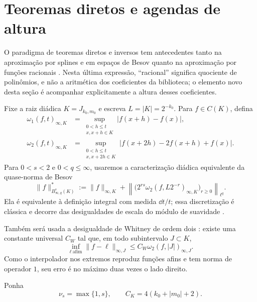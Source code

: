 \section{Teoremas diretos e agendas de altura}
\label{sec:direct-height}

O paradigma de teoremas diretos e inversos tem antecedentes tanto na
aproximação por splines e em espaços de Besov quanto na aproximação por funções
racionais \citep{petrushev1988,petrushevpopov1987}. Nesta última expressão,
``racional'' significa quociente de polinômios, e não a aritmética dos
coeficientes da biblioteca; o elemento novo desta seção é acompanhar
explicitamente a altura desses coeficientes.

Fixe a raiz diádica $K=J_{k_0,m_0}$ e escreva $L=|K|=2^{-k_0}$. Para
$f\in C(K)$, defina
\begin{align}
 \omega_1(f,t)_{\infty,K}
 &=\sup_{\substack{0<h\le t\\x,x+h\in K}}
   |f(x+h)-f(x)|,\label{eq:first-modulus}\\
 \omega_2(f,t)_{\infty,K}
 &=\sup_{\substack{0<h\le t\\x,x+2h\in K}}
   |f(x+2h)-2f(x+h)+f(x)|.
 \label{eq:second-modulus-direct}
\end{align}
Para $0<s<2$ e $0<q\le\infty$, usaremos a caracterização diádica equivalente da
quase-norma de Besov
\begin{equation}
 \|f\|_{B^s_{\infty,q}(K)}^*
 :=\|f\|_{\infty,K}
 +\left\|\bigl(2^{rs}\omega_2(f,L2^{-r})_{\infty,K}
           \bigr)_{r\ge0}\right\|_{\ell^q}.
 \label{eq:dyadic-besov-norm}
\end{equation}
Ela é equivalente à definição integral com medida $\dd t/t$; essa
discretização é clássica e decorre das desigualdades de escala do módulo de
suavidade \citep{devorelorentz1993,devorepopov1988}.

Também será usada a desigualdade de Whitney de ordem dois
\citep{whitney1957,devore1998}: existe uma
constante universal $C_W$ tal que, em todo subintervalo $J\subset K$,
\begin{equation}
 \inf_{\ell\ \text{afim}}\|f-\ell\|_{\infty,J}
 \le C_W\omega_2(f,|J|)_{\infty,J}.
 \label{eq:whitney-direct}
\end{equation}
Como o interpolador nos extremos reproduz funções afins e tem norma de
operador $1$, seu erro é no máximo duas vezes o lado direito.

Ponha
\begin{equation}
 \nu_s=\max\{1,s\},
 \qquad C_K=4(k_0+|m_0|+2).
 \label{eq:height-schedule-constants}
\end{equation}

